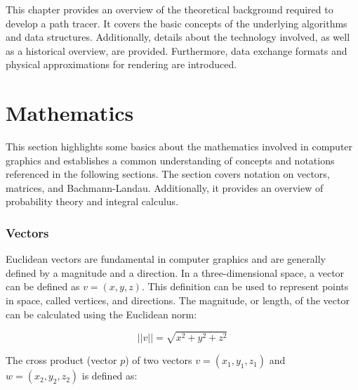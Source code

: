 \label{ch:theory}

This chapter provides an overview of the theoretical background required to develop a path tracer. It covers the basic concepts of the underlying algorithms and data structures. Additionally, details about the technology involved, as well as a historical overview, are provided. Furthermore, data exchange formats and physical approximations for rendering are introduced.

\section{Mathematics}

This section highlights some basics about the mathematics involved in computer graphics and establishes a common understanding of concepts and notations referenced in the following sections. The section covers notation on vectors, matrices, and Bachmann-Landau. Additionally, it provides an overview of probability theory and integral calculus.

\subsubsection{Vectors}

Euclidean vectors are fundamental in computer graphics and are generally defined by a magnitude and a direction. In a three-dimensional space, a vector can be defined as $v = (x, y, z)$. This definition can be used to represent points in space, called vertices, and directions. The magnitude, or length, of the vector can be calculated using the Euclidean norm:

\begin{equation}
  \label{eqn:euclidean-norm}
  ||v|| = \sqrt{x^2 + y^2 + z^2}
\end{equation}



The cross product (vector $p$) of two vectors $v = (x_1, y_1, z_1)$ and $w = (x_2, y_2, z_2)$ is defined as:

